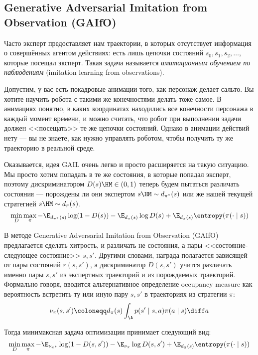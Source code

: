 \subsection{Generative Adversarial Imitation from Observation (GAIfO)}

Часто эксперт предоставляет нам траектории, в которых отсутствует информация о совершённых агентом действиях: есть лишь цепочки состояний $s_0, s_1, s_2, \dots$, которые посещал эксперт. Такая задача называется \emph{имитационным обучением по наблюдениям} (imitation learning from observations).

\begin{example}
Допустим, у вас есть покадровые анимации того, как персонаж делает сальто. Вы хотите научить робота с такими же конечностями делать тоже самое. В анимациях понятно, в каких координатах находились все конечности персонажа в каждый момент времени, и можно считать, что робот при выполнении задачи должен <<посещать>> те же цепочки состояний. Однако в анимации действий нету --- вы не знаете, как нужно управлять роботом, чтобы получить ту же траекторию в реальной среде.
\end{example}

Оказывается, идея GAIL очень легко и просто расширяется на такую ситуацию. Мы просто хотим попадать в те же состояния, в которые попадал эксперт, поэтому дискриминатором $D(s) \HM \in (0, 1)$ теперь будем пытаться различать состояния --- порождены ли они экспертом $s \HM\sim d_{\pi^*}(s)$ или же нашей текущей стратегией $s \HM\sim d_{\pi}(s)$.
$$
\min\limits_{D} \max\limits_{\pi} -\E_{d_{\pi^*}(s)} \log (1 - D(s)) - \E_{d_{\pi}(s)} \log D(s) + \E_{d_\pi(s)}\entropy(\pi(\cdot \mid s))
$$

В методе Generative Adversarial Imitation from Observation (GAIfO) предлагается сделать хитрость, и различать не состояния, а пары <<состояние-следующее состояние>> $s, s'$. Другими словами, награда полагается зависящей от пары состояний $r(s, s')$, а дискриминатор $D(s, s')$ учится различать именно пары $s, s'$ из экспертных траекторий и из порождаемых траекторий. Формально говоря, вводится альтернативное определение occupancy measure как вероятность встретить ту или иную пару $s, s'$ в траекториях из стратегии $\pi$:
$$
\nu_\pi(s, s') \coloneqq d_\pi(s) \int_\A p(s' \mid s, a) \pi(a \mid s) \diff a
$$

Тогда минимаксная задача оптимизации принимает следующий вид:
$$
\min\limits_{D} \max\limits_{\pi} -\E_{\nu_{\pi^*}} \log (1 - D(s, s')) - \E_{\nu_\pi} \log D(s, s') + \E_{d_\pi(s)}\entropy(\pi(\cdot \mid s))
$$

